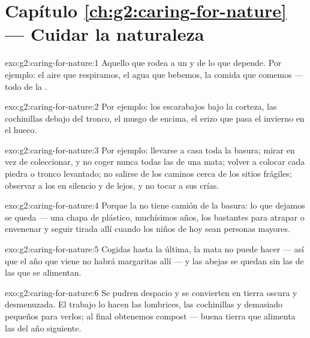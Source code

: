 \section*{Capítulo \ref{ch:g2:caring-for-nature} --- Cuidar la naturaleza}

\begin{solution}{exo:g2:caring-for-nature:1}
Aquello que rodea a un  y de lo que depende. Por ejemplo: el
aire que respiramos, el agua que bebemos, la comida que comemos ---
todo de la .
\end{solution}

\begin{solution}{exo:g2:caring-for-nature:2}
Por ejemplo: los escarabajos bajo la corteza, las cochinillas debajo
del tronco, el musgo de encima, el erizo que pasa el invierno en el hueco.
\end{solution}

\begin{solution}{exo:g2:caring-for-nature:3}
Por ejemplo: llevarse a casa toda la basura; mirar en vez de
coleccionar, y no coger nunca todas las  de una mata; volver a
colocar cada piedra o tronco levantado; no salirse de los caminos
cerca de los sitios frágiles; observar a los  en silencio y de
lejos, y no tocar a sus crías.
\end{solution}

\begin{solution}{exo:g2:caring-for-nature:4}
Porque la  no tiene camión de la basura: lo que dejamos se
queda --- una chapa de plástico, muchísimos años, los bastantes para
atrapar o envenenar  y seguir tirada allí cuando los niños de
hoy sean personas mayores.
\end{solution}

\begin{solution}{exo:g2:caring-for-nature:5}
Cogidas hasta la última, la mata no puede hacer  --- así que
el año que viene no habrá margaritas allí --- y las abejas se quedan
sin las  de las que se alimentan.
\end{solution}

\begin{solution}{exo:g2:caring-for-nature:6}
Se pudren despacio y se convierten en tierra oscura y desmenuzada.
El trabajo lo hacen las lombrices, las cochinillas y 
demasiado pequeños para verlos; al final obtenemos compost --- buena
tierra que alimenta las  del año siguiente.
\end{solution}

